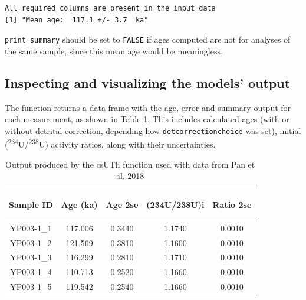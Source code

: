 \documentclass[]{elsarticle} %
\begin{document}
\begin{verbatim}
All required columns are present in the input data
[1] "Mean age:  117.1 +/- 3.7  ka"
\end{verbatim}

\texttt{print\_summary} should be set to \texttt{FALSE} if ages computed are not for analyses of the same sample, since this mean age would be meaningless.

\hypertarget{inspecting-and-visualizing-the-models-output}{%
\subsection{Inspecting and visualizing the models' output}\label{inspecting-and-visualizing-the-models-output}}

The function returns a data frame with the age, error and summary output for each measurement, as shown in Table \ref{tab:panoutput}. This includes calculated ages (with or without detrital correction, depending how \texttt{detcorrectionchoice} was set), initial (\textsuperscript{234}U/\textsuperscript{238}U) activity ratios, along with their uncertainties.

\begin{table}[ht]
\centering
\begin{tabular}{ccccc}
  \hline
\begin{sideways} Sample ID \end{sideways} & \begin{sideways} Age (ka) \end{sideways} & \begin{sideways} Age 2se \end{sideways} & \begin{sideways} (234U/238U)i \end{sideways} & \begin{sideways} Ratio 2se \end{sideways} \\ 
  \hline
YP003-1\_1 & 117.006 & 0.3440 & 1.1740 & 0.0010 \\ 
  YP003-1\_2 & 121.569 & 0.3810 & 1.1600 & 0.0010 \\ 
  YP003-1\_3 & 116.299 & 0.2810 & 1.1710 & 0.0010 \\ 
  YP003-1\_4 & 110.713 & 0.2520 & 1.1660 & 0.0010 \\ 
  YP003-1\_5 & 119.542 & 0.2540 & 1.1660 & 0.0010 \\ 
   \hline
\end{tabular}
\caption{\label{tab:panoutput}Output produced by the csUTh function used with data from Pan et al. 2018} 
\end{table}
\end{document}
